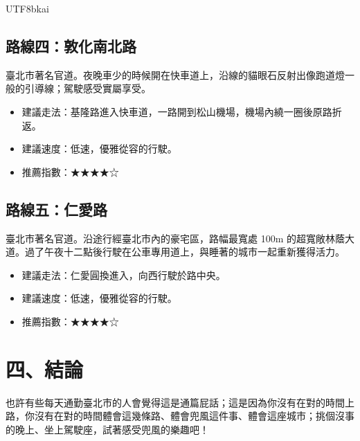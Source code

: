 \documentclass[a4paper, 12pt, oneside]{article}
\begin{document}
\begin{CJK}{UTF8}{bkai}
\subsection*{路線四：敦化南北路}
臺北市著名官道。夜晚車少的時候開在快車道上，沿線的貓眼石反射出像跑道燈一般的引導線；駕駛感受實屬享受。
\begin{itemize}
	\item 建議走法：基隆路進入快車道，一路開到松山機場，機場內繞一圈後原路折返。
	\item 建議速度：低速，優雅從容的行駛。
	\item 推薦指數：★★★★☆
\end{itemize}
\subsection*{路線五：仁愛路}
臺北市著名官道。沿途行經臺北市內的豪宅區，路幅最寬處 100m 的超寬敞林蔭大道。過了午夜十二點後行駛在公車專用道上，與睡著的城市一起重新獲得活力。
\begin{itemize}
	\item 建議走法：仁愛圓換進入，向西行駛於路中央。
	\item 建議速度：低速，優雅從容的行駛。
	\item 推薦指數：★★★★☆
\end{itemize}
\section*{四、結論}
也許有些每天通勤臺北市的人會覺得這是通篇屁話；這是因為你沒有在對的時間上路，你沒有在對的時間體會這幾條路、體會兜風這件事、體會這座城市；挑個沒事的晚上、坐上駕駛座，試著感受兜風的樂趣吧！
\end{CJK}
\end{document}
